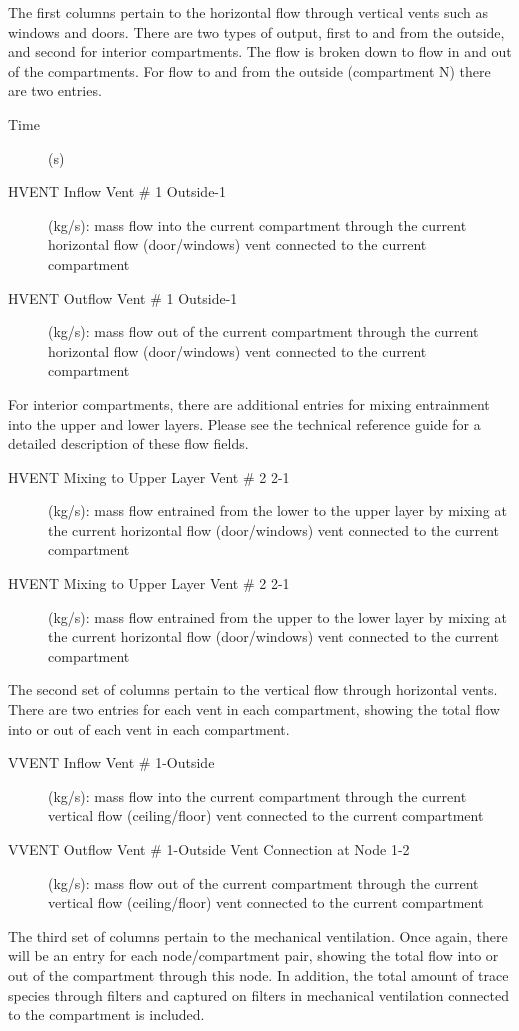 The first columns pertain to the horizontal flow through vertical vents such as windows and doors. There are two types of output, first to and from the outside, and second for interior compartments. The flow is broken down to flow in and out of the compartments. For flow to and from the outside (compartment N) there are two entries.
\begin{description}
\item[Time] (s)
\item[HVENT Inflow Vent \# 1 Outside-1] (kg/s): mass flow into the current compartment through the current horizontal flow (door/windows) vent connected to the current compartment
\item[HVENT Outflow Vent \# 1 Outside-1] (kg/s): mass flow out of the current compartment through the current horizontal flow (door/windows) vent connected to the current compartment
\end{description}
For interior compartments, there are additional entries for mixing entrainment into the upper and lower layers. Please see the technical reference guide for a detailed description of these flow fields.
\begin{description}
\item[HVENT Mixing to Upper Layer Vent \# 2 2-1] (kg/s): mass flow entrained from the lower to the upper layer by mixing at the current horizontal flow (door/windows) vent connected to the current compartment
\item[HVENT Mixing to Upper Layer Vent \# 2 2-1] (kg/s): mass flow entrained from the upper to the lower layer by mixing at the current horizontal flow (door/windows) vent connected to the current compartment
\end{description}
The second set of columns pertain to the vertical flow through horizontal vents. There are two entries for each vent in each compartment, showing the total flow into or out of each vent in each compartment.
\begin{description}
\item[VVENT Inflow Vent \# 1-Outside] (kg/s):  mass flow into the current compartment through the current vertical flow (ceiling/floor) vent connected to the current compartment
\item[VVENT Outflow Vent \# 1-Outside Vent Connection at Node 1-2] (kg/s):  mass flow out of the current  compartment through the current vertical flow (ceiling/floor) vent connected to the current compartment
\end{description}
The third set of columns pertain to the mechanical ventilation. Once again, there will be an entry for each node/compartment pair, showing the total flow into or out of the compartment through this node. In addition, the total amount of trace species through filters and captured on filters in mechanical ventilation connected to the compartment is included.
